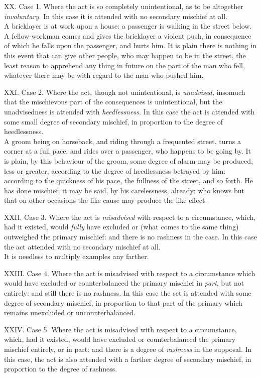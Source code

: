 \documentclass[12pt]{report}
\begin{document}
XX. Case 1. Where the act is so completely unintentional, as to be
altogether \emph{involuntary.} In this case it is attended with no
secondary mischief at all.\\
A bricklayer is at work upon a house: a passenger is walking in the
street below. A fellow-workman comes and gives the bricklayer a violent
push, in consequence of which he falls upon the passenger, and hurts
him. It is plain there is nothing in this event that can give other
people, who may happen to be in the street, the least reason to
apprehend any thing in future on the part of the man who fell, whatever
there may be with regard to the man who pushed him.

XXI. Case 2. Where the act, though not unintentional, is
\emph{unadvised,} insomuch that the mischievous part of the consequences
is unintentional, but the unadvisedness is attended with
\emph{heedlessness.} In this case the act is attended with some small
degree of secondary mischief, in proportion to the degree of
heedlessness.\\
A groom being on horseback, and riding through a frequented street,
turns a corner at a full pace, and rides over a passenger, who happens
to be going by. It is plain, by this behaviour of the groom, some degree
of alarm may be produced, less or greater, according to the degree of
heedlessness betrayed by him: according to the quickness of his pace,
the fullness of the street, and so forth. He has done mischief, it may
be said, by his carelessness, already: who knows but that on other
occasions the like cause may produce the like effect.

XXII. Case 3. Where the act is \emph{misadvised} with respect to a
circumstance, which, had it existed, would \emph{fully} have excluded or
(what comes to the same thing) outweighed the primary mischief: and
there is no rashness in the case. In this case the act attended with no
secondary mischief at all.\\
It is needless to multiply examples any farther.

XXIII. Case 4. Where the act is misadvised with respect to a
circumstance which would have excluded or counterbalanced the primary
mischief in \emph{part}, but not entirely: and still there is no
rashness. In this case the set is attended with some degree of secondary
mischief, in proportion to that part of the primary which remains
unexcluded or uncounterbalanced.

XXIV. Case 5. Where the act is misadvised with respect to a
circumstance, which, had it existed, would have excluded or
counterbalanced the primary mischief entirely, or in part: and there is
a degree of \emph{rashness} in the supposal. In this case, the act is
also attended with a farther degree of secondary mischief, in proportion
to the degree of rashness.
\end{document}
